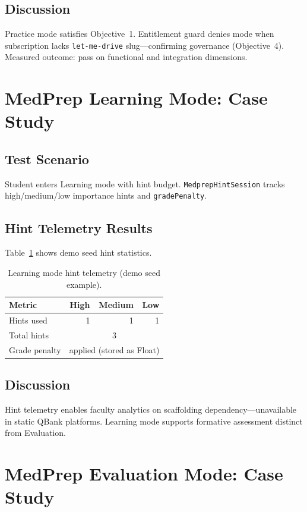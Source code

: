 \subsection{Discussion}
Practice mode satisfies Objective~1. Entitlement guard denies mode when subscription lacks \texttt{let-me-drive} slug---confirming governance (Objective~4). Measured outcome: pass on functional and integration dimensions.

\section{MedPrep Learning Mode: Case Study}
\subsection{Test Scenario}
Student enters Learning mode with hint budget. \texttt{MedprepHintSession} tracks high/medium/low importance hints and \texttt{gradePenalty}.

\subsection{Hint Telemetry Results}
Table~\ref{tab:hint-telemetry} shows demo seed hint statistics.

\begin{table}[htbp]
  \centering
  \caption{Learning mode hint telemetry (demo seed example).}
  \label{tab:hint-telemetry}
  \begin{tabular}{@{}lrrr@{}}
    \toprule
    \textbf{Metric} & \textbf{High} & \textbf{Medium} & \textbf{Low} \\
    \midrule
    Hints used & 1 & 1 & 1 \\
    Total hints & \multicolumn{3}{c}{3} \\
    Grade penalty & \multicolumn{3}{c}{applied (stored as Float)} \\
    \bottomrule
  \end{tabular}
\end{table}

\subsection{Discussion}
Hint telemetry enables faculty analytics on scaffolding dependency---unavailable in static QBank platforms. Learning mode supports formative assessment distinct from Evaluation.

\section{MedPrep Evaluation Mode: Case Study}

